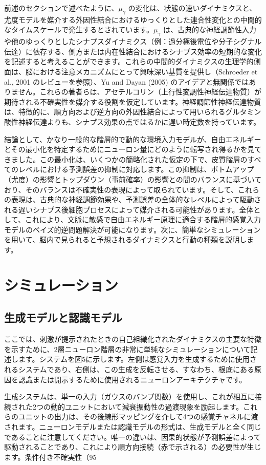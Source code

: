 \documentclass{article}
\begin{document}
前述のセクションで述べたように、$\mu_\gamma$ の変化は、状態の速いダイナミクスと、尤度モデルを媒介する外因性結合におけるゆっくりとした連合性変化との中間的なタイムスケールで発生するとされています。$\mu_\gamma$ は、古典的な神経調節性入力や他のゆっくりとしたシナプスダイナミクス（例：過分極後電位や分子シグナル伝達）に依存する、側方または内在性結合におけるシナプス効率の短期的な変化を記述すると考えることができます。これらの中間的ダイナミクスの生理学的側面は、脳における注意メカニズムにとって興味深い基質を提供し（Schroeder et al., 2001 のレビューを参照）、Yu and Dayan (2005) のアイデアと無関係ではありません。これらの著者らは、アセチルコリン（上行性変調性神経伝達物質）が期待される不確実性を媒介する役割を仮定しています。神経調節性神経伝達物質は、特徴的に、順方向および逆方向の外因性結合によって用いられるグルタミン酸性神経伝達よりも、シナプス効果の点ではるかに遅い時定数を持っています。

結論として、かなり一般的な階層的で動的な環境入力モデルが、自由エネルギーとその最小化を特定するためにニューロン量にどのように転写され得るかを見てきました。この最小化は、いくつかの簡略化された仮定の下で、皮質階層のすべてのレベルにおける予測誤差の抑制に対応します。この抑制は、ボトムアップ（尤度）の影響とトップダウン（事前確率）の影響との間のバランスに基づいており、そのバランスは不確実性の表現によって取られています。そして、これらの表現は、古典的な神経調節効果や、予測誤差の全体的なレベルによって駆動される遅いシナプス後細胞プロセスによって媒介される可能性があります。全体として、これにより、文脈に敏感で自由エネルギー原理に適合する階層的感覚入力モデルのベイズ的逆問題解決が可能になります。次に、簡単なシミュレーションを用いて、脳内で見られると予想されるダイナミクスと行動の種類を説明します。


\section{シミュレーション}

\subsection{生成モデルと認識モデル}
ここでは、刺激が提示されたときの自己組織化されたダイナミクスの主要な特徴を示すために、2層ニューロン階層の非常に単純なシミュレーションについて記述します。システムを図5に示します。左側は感覚入力を生成するために使用されるシステムであり、右側は、この生成を反転させる、すなわち、根底にある原因を認識または開示するために使用されるニューロンアーキテクチャです。

生成システムは、単一の入力（ガウスのバンプ関数）を使用し、これが相互に接続された2つの動的ユニットにおいて減衰振動性の過渡現象を励起します。これらのユニットの出力は、その後線形マッピングを介して4つの感覚チャネルに渡されます。ニューロンモデルまたは認識モデルの形式は、生成モデルと全く同じであることに注意してください。唯一の違いは、因果的状態が予測誤差によって駆動されることであり、これにより順方向接続（赤で示される）の必要性が生じます。条件付き不確実性（95%
\end{document}
